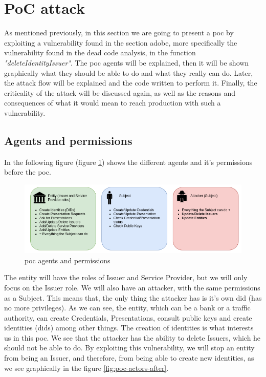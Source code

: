 \documentclass[a4paper, 12pt]{article} %
\begin{document}
\newpage
\section{PoC attack}
    As mentioned previously, in this section we are going to present a \acrfull{poc} by exploiting a vulnerability found in the section adobe, more specifically the vulnerability found in the dead code analysis, in the function \textit{"deleteIdentityIssuer"}. The \acrshort{poc} agents will be explained, then it will be shown graphically what they should be able to do and what they really can do. Later, the attack flow will be explained and the code written to perform it. Finally, the criticality of the attack will be discussed again, as well as the reasons and consequences of what it would mean to reach production with such a vulnerability.

    \subsection{Agents and permissions}
        In the following figure (figure \ref{fig:poc-actors}) shows the different agents and it's permissions before the \acrshort{poc}.\\ 
        \begin{figure}[h]
            \centering
            \includegraphics[width=1.0\textwidth]{poc-actors.png}
            \caption{\acrshort{poc} agents and permissions}
            \label{fig:poc-actors}
        \end{figure}
        
        The entity will have the roles of Issuer and Service Provider, but we will only focus on the Issuer role. We will also have an attacker, with the same permissions as a Subject. This means that, the only thing the attacker has is it's own \acrshort{did} (has no more privileges). As we can see, the entity, which can be a bank or a traffic authority, can create Credentials, Presentations, consult public keys and create identities (\acrshort{did}s) among other things. The creation of identities is what interests us in this \acrshort{poc}. We see that the attacker has the ability to delete Issuers, which he should not be able to do. By exploiting this vulnerability, we will stop an entity from being an Issuer, and therefore, from being able to create new identities, as we see graphically in the figure \ref{fig:poc-actors-after}.
        
\end{document}

